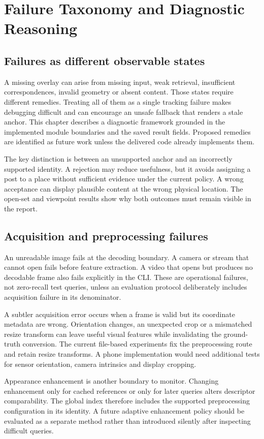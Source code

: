 \chapter{Failure Taxonomy and Diagnostic Reasoning}\label{ch:failure-analysis}
\section{Failures as different observable states}
A missing overlay can arise from missing input, weak retrieval, insufficient correspondences, invalid geometry or absent content. Those states require different remedies. Treating all of them as a single tracking failure makes debugging difficult and can encourage an unsafe fallback that renders a stale anchor. This chapter describes a diagnostic framework grounded in the implemented module boundaries and the saved result fields. Proposed remedies are identified as future work unless the delivered code already implements them.

The key distinction is between an unsupported anchor and an incorrectly supported identity. A rejection may reduce usefulness, but it avoids assigning a post to a place without sufficient evidence under the current policy. A wrong acceptance can display plausible content at the wrong physical location. The open-set and viewpoint results show why both outcomes must remain visible in the report.

\section{Acquisition and preprocessing failures}
An unreadable image fails at the decoding boundary. A camera or stream that cannot open fails before feature extraction. A video that opens but produces no decodable frame also fails explicitly in the CLI. These are operational failures, not zero-recall test queries, unless an evaluation protocol deliberately includes acquisition failure in its denominator.

A subtler acquisition error occurs when a frame is valid but its coordinate metadata are wrong. Orientation changes, an unexpected crop or a mismatched resize transform can leave useful visual features while invalidating the ground-truth conversion. The current file-based experiments fix the preprocessing route and retain resize transforms. A phone implementation would need additional tests for sensor orientation, camera intrinsics and display cropping.

Appearance enhancement is another boundary to monitor. Changing enhancement only for cached references or only for later queries alters descriptor comparability. The global index therefore includes the supported preprocessing configuration in its identity. A future adaptive enhancement policy should be evaluated as a separate method rather than introduced silently after inspecting difficult queries.

